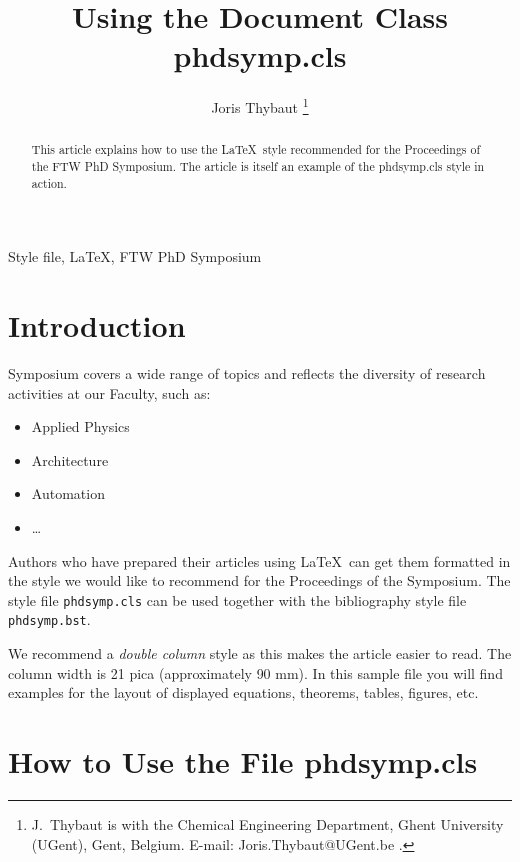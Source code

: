 \documentclass[twocolumn]{phdsymp} %
\begin{document}
\title{Using the Document Class phdsymp.cls} %

\author{Joris Thybaut \thanks{J.~Thybaut is with the Chemical
    Engineering Department, Ghent University (UGent), Gent,
Belgium. E-mail: Joris.Thybaut@UGent.be .}}


\maketitle

\begin{abstract}
This article explains how to use the \LaTeX\ style recommended for the
Proceedings of the FTW PhD Symposium. The article is itself an example of the
phdsymp.cls style in action.
\end{abstract}

\begin{keywords}
Style file, \LaTeX, FTW PhD Symposium
\end{keywords}

\section{Introduction}
 Symposium covers a wide range of topics and reflects the
diversity of research activities at our Faculty, such as:

\begin{itemize}
\item Applied Physics
\item Architecture
\item Automation
\item \ldots{}
\end{itemize}

Authors who have prepared their articles using \LaTeX\
can get them formatted in the style we would like to recommend for the
Proceedings of the Symposium.  The style file {\tt phdsymp.cls} can be used
together with the bibliography style file {\tt phdsymp.bst}.

We recommend a {\em double column} style as this makes the article easier to
read. The column width is 21 pica (approximately 90 mm). In this sample file
you will find examples for the layout of displayed equations, theorems, tables,
figures, etc.
%


\section{How to Use the File phdsymp.cls}
\end{document}
